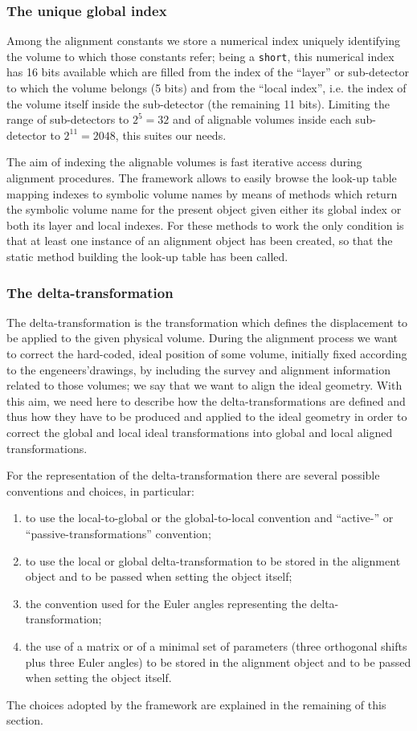 \documentclass[12pt,a4paper,twoside]{article}
\begin{document}
{\subsubsection{The unique global index}
Among the alignment constants we store a numerical index uniquely
identifying the volume to which those constants refer; being a
\lstinline!short!, this numerical index has 16 bits available which
are filled from the index of the ``layer'' or sub-detector to which
the volume belongs (5 bits) and from the ``local index'', i.e. the
index of the volume itself inside the sub-detector (the remaining 11
bits). Limiting the range of sub-detectors to $2^5=32$ and of
alignable volumes inside each sub-detector to $2^{11}=2048$, this
suites our needs.

The aim of indexing the alignable volumes is fast iterative access
during alignment procedures. The framework allows to easily
browse the look-up table mapping indexes to symbolic volume names by
means of methods which return the symbolic volume name for the present
object given either its global index or both its layer and local
indexes. For these methods to work the only condition is that at least
one instance of an alignment object has been created, so that the
static method building the look-up table has been called.


\subsubsection{The delta-transformation}
\label{ssec:delta}
The delta-transformation is the transformation which defines the
displacement to be applied to the given physical volume.
During the alignment process we want to correct the hard-coded, ideal
position of some volume, initially fixed according to the
engeneers'drawings, by including the survey and alignment information
related to those volumes; we say that we want to align the ideal
geometry. With this aim, we need here to describe how the
delta-transformations are defined and thus how they have to be produced and
applied to the ideal geometry in order to correct the global and local
ideal transformations into global and local aligned transformations.

For the representation of the delta-transformation there are several
possible conventions and choices, in particular: 
\begin{enumerate}
  \item to use the local-to-global or the global-to-local convention and
    ``active-'' or ``passive-transformations'' convention;
  \item to use the local or global delta-transformation to be stored in the
    alignment object and to be passed when setting the object itself;
  \item the convention used for the Euler angles representing the
    delta-transformation;
  \item the use of a matrix or of a minimal set of parameters (three
    orthogonal shifts plus three Euler angles) to be stored in the
    alignment object and to be passed when setting the object itself.
\end{enumerate}
The choices adopted by the framework are explained in the remaining of
this section.

}
\end{document}
